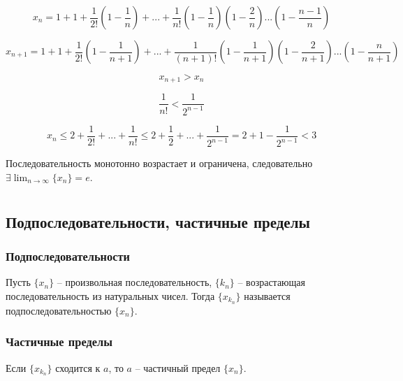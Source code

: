 \documentclass{article}
\begin{document}
        \[ x_n = 1 + 1 + \frac{1}{2!} \left(1 - \frac{1}{n}\right) + ... +
        \frac{1}{n!} \left(1 - \frac{1}{n}\right) \left(1 - \frac{2}{n}\right) ... \left(1 - \frac{n - 1}{n}\right) \]
        
        \[ x_{n + 1} = 1 + 1 + \frac{1}{2!} \left(1 - \frac{1}{n + 1}\right) + ... +
        \frac{1}{(n + 1)!} \left(1 - \frac{1}{n + 1}\right) \left(1 - \frac{2}{n + 1}\right) ... \left(1 - \frac{n}{n + 1}\right) \]
        
        \[ x_{n + 1} > x_{n} \]
        
        \[ \frac{1}{n!} < \frac{1}{2^{n-1}} \]
        
        \[ x_n \le 2 + \frac{1}{2!} + ... + \frac{1}{n!} \le 2 + \frac{1}{2} + ... + \frac{1}{2^{n-1}} =
        2 + 1 - \frac{1}{2^{n-1}} < 3 \]
        
        Последовательность монотонно возрастает и ограничена, следовательно $\exists \lim_{n\to\infty} \{x_n\} = e$.
        
        
    \newpage
        
    \section{}
    \subsection*{Подпоследовательности, частичные пределы}
        \subsubsection*{Подпоследовательности}
            Пусть $\{x_n\}$ -- произвольная последовательность, $\{k_n\}$ -- возрастающая последовательность из натуральных чисел.
            Тогда $\{x_{k_n}\}$ называется подпоследовательностью $\{x_n\}$.
            
        \subsubsection*{Частичные пределы}
            Если $\{x_{k_n}\}$ сходится к $a$, то $a$ -- частичный предел $\{x_n\}$.
        
        
\end{document}
